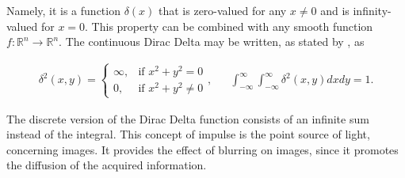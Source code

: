 Namely, it is a function $\delta(x)$ that is zero-valued for any $x \neq 0$ and is infinity-valued for $x = 0$. This property can be combined with any smooth function $f\colon \mathbb{R}^{n} \to \mathbb{R}^{n}$.
The continuous Dirac Delta may be written, as stated by , as

\begin{align}
\label{eqn:dirac_delta_function}
\delta^{2}(x,y)= 
\begin{cases}
    \infty, & \text{if } x^{2} + y^{2} =0\\
    0, & \text{if } x^{2} + y^{2} \neq 0
\end{cases},
&&
\int_{-\infty}^{\infty}
\int_{-\infty}^{\infty}
\delta^{2}(x,y)dxdy = 1.
\end{align}

\noindent The discrete version of the Dirac Delta function consists of an infinite sum instead of the integral. This concept of impulse is the point source of light, concerning images. It provides the effect of blurring on images, since it promotes the diffusion of the acquired information.